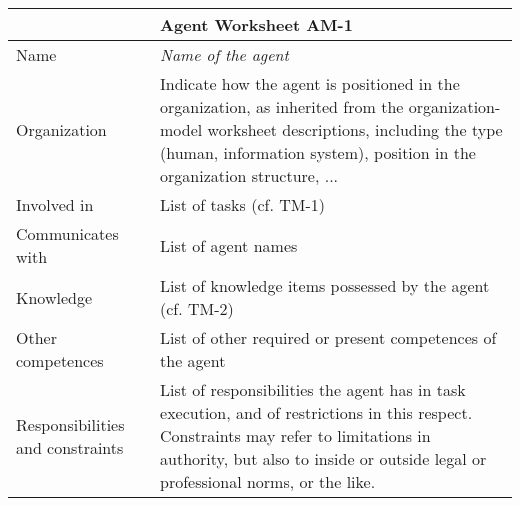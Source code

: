 \begin{tabular}%
       {|>{\colleft}p{3cm}%
        |>{\colleft}p{8cm}|}
\hline
{\bf Agent Model} & {\bf Agent Worksheet AM-1} \\
\hline
\hline
\sc Name & {\em Name of the agent} \\
\hline
\sc Organization & {\rm Indicate how the agent is positioned in the
               organization, as inherited from the organization-model worksheet
               descriptions, including the type (human,
               information system), position in the
               organization structure, ...
               } \\
\hline
\sc Involved in & {\rm List of tasks (cf. TM-1)} \\
\hline
\sc Communicates with & {\rm List of agent names} \\
\hline
\sc Knowledge & {\rm List of knowledge items possessed by the agent
             (cf. TM-2)} \\
\hline
\sc Other competences &
              {\rm List of other required or present competences of
              the agent} \\
\hline
\sc Responsibilities and constraints &
              {\rm List of responsibilities the agent has in
              task execution, and of restrictions in this
              respect. Constraints may refer to limitations in
              authority, but also to inside or outside legal or
              professional norms, or the like.
              } \\
\hline
\end{tabular}
